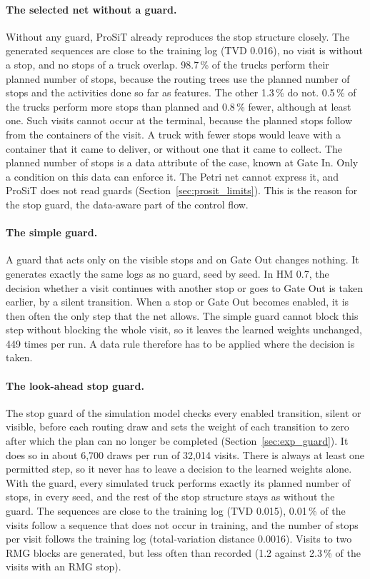 \paragraph{The selected net without a guard.} Without any guard, ProSiT already
reproduces the stop structure closely. The generated sequences are close to the
training log (TVD 0.016), no visit is without a stop, and no stops of a truck
overlap. 98.7\,\% of the trucks perform their planned number of stops, because the
routing trees use the planned number of stops and the activities done so far as
features. The other 1.3\,\% do not. 0.5\,\% of the trucks perform more stops than
planned and 0.8\,\% fewer, although at least one. Such visits cannot occur at the
terminal, because the planned stops follow from the containers of the visit. A
truck with fewer stops would leave with a container that it came to deliver, or
without one that it came to collect. The planned number of stops is a data
attribute of the case, known at Gate In. Only a condition on this data can enforce
it. The Petri net cannot express it, and ProSiT does not read guards
(Section~\ref{sec:prosit_limits}). This is the reason for the stop guard, the
data-aware part of the control flow.

\paragraph{The simple guard.} A guard that acts only on the visible stops and on
Gate Out changes nothing. It generates exactly the same logs as no guard, seed by
seed. In HM 0.7, the decision whether a visit continues with another stop or goes to
Gate Out is taken earlier, by a silent transition. When a stop or Gate Out becomes
enabled, it is then often the only step that the net allows. The simple guard
cannot block this step without blocking the whole visit, so it leaves the learned
weights unchanged, 449 times per run. A data rule therefore has to be applied where
the decision is taken.

\paragraph{The look-ahead stop guard.} The stop guard of the simulation model
checks every enabled transition, silent or visible, before each routing draw and
sets the weight of each transition to zero after which the plan can no longer be
completed (Section~\ref{sec:exp_guard}). It does so in about 6,700 draws per run of
32,014 visits. There is always at least one permitted step, so it never has to
leave a decision to the learned weights alone. With the guard, every simulated truck
performs exactly its planned number of stops, in every seed, and the rest of the
stop structure stays as without the guard. The sequences are close to the training
log (TVD 0.015), 0.01\,\% of the visits follow a sequence that does not occur in
training, and the number of stops per visit follows the training log
(total-variation distance 0.0016). Visits to two RMG blocks are generated, but less
often than recorded (1.2 against 2.3\,\% of the visits with an RMG stop).

